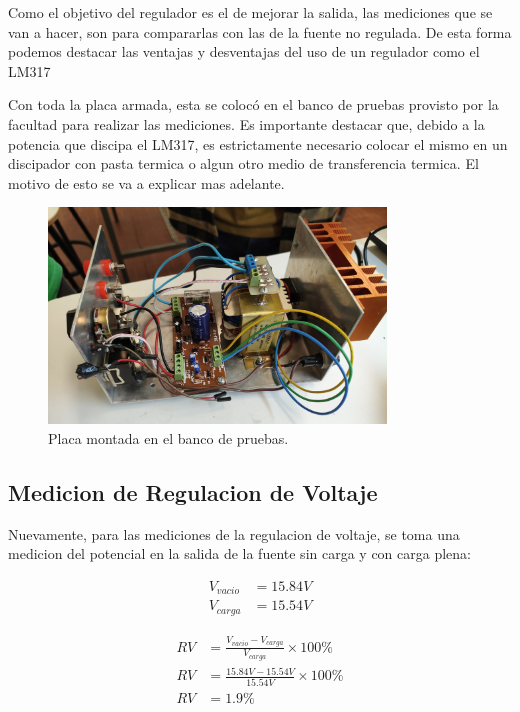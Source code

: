 \documentclass[chaptersright]{informeutn}
\begin{document}
      Como el objetivo del regulador es el de mejorar la salida, las mediciones que se van a hacer, son para
      compararlas con las de la fuente no regulada. De esta forma podemos destacar las ventajas y desventajas del uso
      de un regulador como el LM317

      Con toda la placa armada, esta se colocó en el banco de pruebas provisto por la facultad para realizar las
      mediciones. Es importante destacar que, debido a la potencia que discipa el LM317, es estrictamente necesario
      colocar el mismo en un discipador con pasta termica o algun otro medio de transferencia termica. El motivo de
      esto se va a explicar mas adelante.

      \begin{figure}[h!]
        \centering
        \includegraphics[width=0.8\textwidth]{pictures/reg_banco-prueb.jpeg}
        \caption{Placa montada en el banco de pruebas.}
      \end{figure}

      \subsection{Medicion de Regulacion de Voltaje}
        Nuevamente, para las mediciones de la regulacion de voltaje, se toma una medicion del potencial en la salida de
        la fuente sin carga y con carga plena:
        \begin{figure}[h]
          \centering
          \begin{minipage}{0.4\textwidth}
            \begin{align*}
              V_{vacio} &= 15.84V\\[6pt]
              V_{carga} &= 15.54V
            \end{align*}
          \end{minipage}
          \begin{minipage}{0.4\textwidth}
            \begin{align*}
              RV &= \frac{V_{vacio} - V_{carga}}{V_{carga}} \times 100\%\\[6pt]
              RV &= \frac{15.84V - 15.54V}{15.54V} \times 100\%\\[6pt]
              RV &= 1.9\%
            \end{align*}
          \end{minipage}
        \end{figure}
\end{document}
